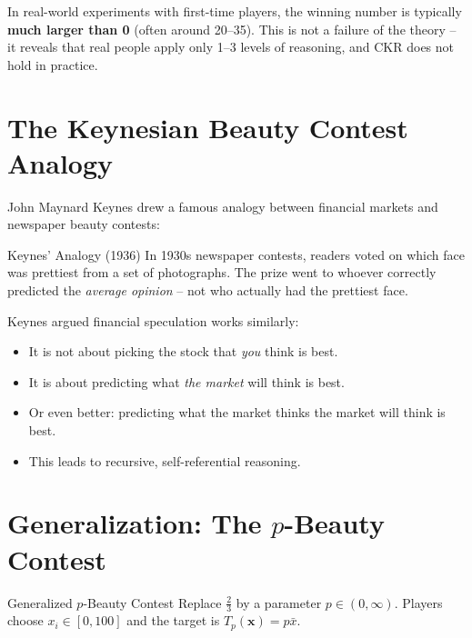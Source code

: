 \documentclass[12pt, a4paper]{article}
\begin{document}
\begin{notebox}
  In real-world experiments with first-time players, the winning number is typically \textbf{much larger than 0} (often around 20--35). This is not a failure of the theory -- it reveals that real people apply only 1--3 levels of reasoning, and CKR does not hold in practice.
\end{notebox}

\section{The Keynesian Beauty Contest Analogy}

John Maynard Keynes drew a famous analogy between financial markets and newspaper beauty contests:

\begin{exbox}{Keynes' Analogy (1936)}
  In 1930s newspaper contests, readers voted on which face was prettiest from a set of photographs. The prize went to whoever correctly predicted the \emph{average opinion} -- not who actually had the prettiest face.

  \smallskip
  Keynes argued financial speculation works similarly:
  \begin{itemize}[leftmargin=*, label=--]
    \item It is not about picking the stock that \emph{you} think is best.
    \item It is about predicting what \emph{the market} will think is best.
    \item Or even better: predicting what the market thinks the market will think is best.
    \item This leads to recursive, self-referential reasoning.
  \end{itemize}
\end{exbox}

\section{Generalization: The $p$-Beauty Contest}

\begin{defbox}{Generalized $p$-Beauty Contest}
  Replace $\frac{2}{3}$ by a parameter $p \in (0,\infty)$.
  Players choose $x_i \in [0,100]$ and the target is $T_p(\mathbf{x}) = p\bar{x}$.
\end{defbox}
\end{document}
